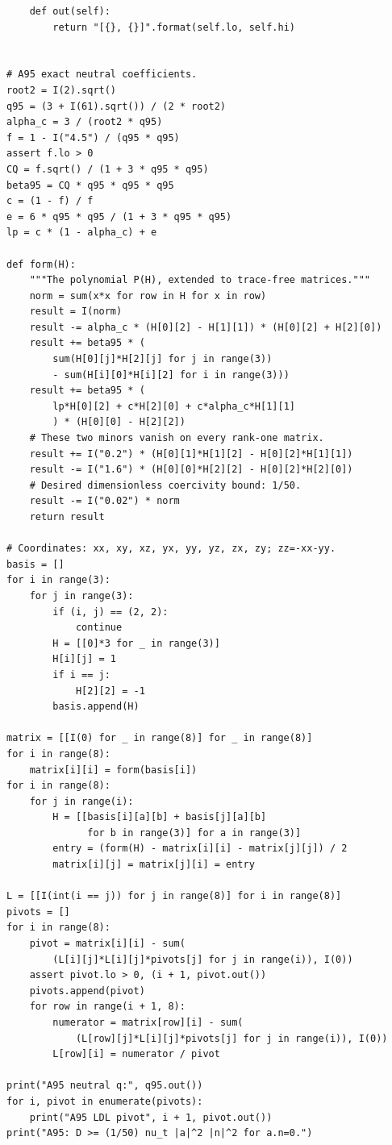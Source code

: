 \documentclass[11pt,a4paper]{article}
\numberwithin{equation}{section}
\begin{document}
\begin{lstlisting}
    def out(self):
        return "[{}, {}]".format(self.lo, self.hi)


# A95 exact neutral coefficients.
root2 = I(2).sqrt()
q95 = (3 + I(61).sqrt()) / (2 * root2)
alpha_c = 3 / (root2 * q95)
f = 1 - I("4.5") / (q95 * q95)
assert f.lo > 0
CQ = f.sqrt() / (1 + 3 * q95 * q95)
beta95 = CQ * q95 * q95 * q95
c = (1 - f) / f
e = 6 * q95 * q95 / (1 + 3 * q95 * q95)
lp = c * (1 - alpha_c) + e

def form(H):
    """The polynomial P(H), extended to trace-free matrices."""
    norm = sum(x*x for row in H for x in row)
    result = I(norm)
    result -= alpha_c * (H[0][2] - H[1][1]) * (H[0][2] + H[2][0])
    result += beta95 * (
        sum(H[0][j]*H[2][j] for j in range(3))
        - sum(H[i][0]*H[i][2] for i in range(3)))
    result += beta95 * (
        lp*H[0][2] + c*H[2][0] + c*alpha_c*H[1][1]
        ) * (H[0][0] - H[2][2])
    # These two minors vanish on every rank-one matrix.
    result += I("0.2") * (H[0][1]*H[1][2] - H[0][2]*H[1][1])
    result -= I("1.6") * (H[0][0]*H[2][2] - H[0][2]*H[2][0])
    # Desired dimensionless coercivity bound: 1/50.
    result -= I("0.02") * norm
    return result

# Coordinates: xx, xy, xz, yx, yy, yz, zx, zy; zz=-xx-yy.
basis = []
for i in range(3):
    for j in range(3):
        if (i, j) == (2, 2):
            continue
        H = [[0]*3 for _ in range(3)]
        H[i][j] = 1
        if i == j:
            H[2][2] = -1
        basis.append(H)

matrix = [[I(0) for _ in range(8)] for _ in range(8)]
for i in range(8):
    matrix[i][i] = form(basis[i])
for i in range(8):
    for j in range(i):
        H = [[basis[i][a][b] + basis[j][a][b]
              for b in range(3)] for a in range(3)]
        entry = (form(H) - matrix[i][i] - matrix[j][j]) / 2
        matrix[i][j] = matrix[j][i] = entry

L = [[I(int(i == j)) for j in range(8)] for i in range(8)]
pivots = []
for i in range(8):
    pivot = matrix[i][i] - sum(
        (L[i][j]*L[i][j]*pivots[j] for j in range(i)), I(0))
    assert pivot.lo > 0, (i + 1, pivot.out())
    pivots.append(pivot)
    for row in range(i + 1, 8):
        numerator = matrix[row][i] - sum(
            (L[row][j]*L[i][j]*pivots[j] for j in range(i)), I(0))
        L[row][i] = numerator / pivot

print("A95 neutral q:", q95.out())
for i, pivot in enumerate(pivots):
    print("A95 LDL pivot", i + 1, pivot.out())
print("A95: D >= (1/50) nu_t |a|^2 |n|^2 for a.n=0.")



\end{lstlisting}
\end{document}
